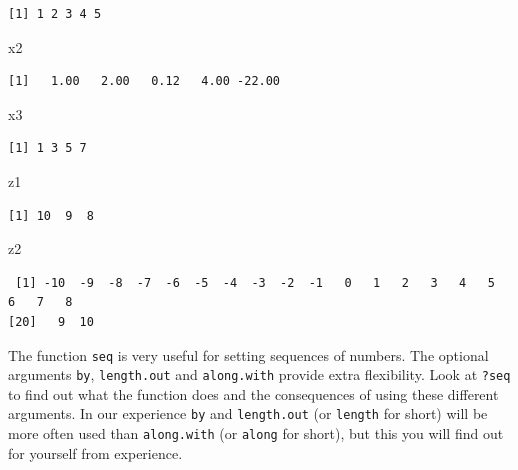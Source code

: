 \documentclass[
  letterpaper,
  DIV=11,
  numbers=noendperiod]{scrartcl}
\newenvironment{Shaded}{\begin{snugshade}}{\end{snugshade}}
\newcommand{\NormalTok}[1]{\textcolor[rgb]{0.00,0.23,0.31}{#1}}
\begin{document}
\begin{verbatim}
[1] 1 2 3 4 5
\end{verbatim}

\begin{Shaded}
\begin{Highlighting}[]
\NormalTok{x2}
\end{Highlighting}
\end{Shaded}

\begin{verbatim}
[1]   1.00   2.00   0.12   4.00 -22.00
\end{verbatim}

\begin{Shaded}
\begin{Highlighting}[]
\NormalTok{x3}
\end{Highlighting}
\end{Shaded}

\begin{verbatim}
[1] 1 3 5 7
\end{verbatim}

\begin{Shaded}
\begin{Highlighting}[]
\NormalTok{z1}
\end{Highlighting}
\end{Shaded}

\begin{verbatim}
[1] 10  9  8
\end{verbatim}

\begin{Shaded}
\begin{Highlighting}[]
\NormalTok{z2}
\end{Highlighting}
\end{Shaded}

\begin{verbatim}
 [1] -10  -9  -8  -7  -6  -5  -4  -3  -2  -1   0   1   2   3   4   5   6   7   8
[20]   9  10
\end{verbatim}

The function \texttt{seq} is very useful for setting sequences of
numbers. The optional arguments \texttt{by}, \texttt{length.out} and
\texttt{along.with} provide extra flexibility. Look at \texttt{?seq} to
find out what the function does and the consequences of using these
different arguments. In our experience \texttt{by} and
\texttt{length.out} (or \texttt{length} for short) will be more often
used than \texttt{along.with} (or \texttt{along} for short), but this
you will find out for yourself from experience.
\end{document}
